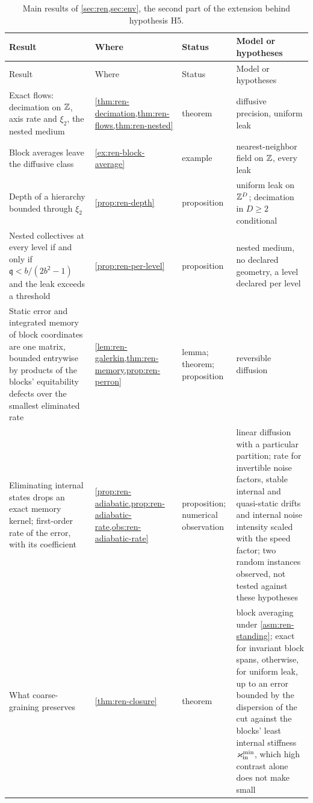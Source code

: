 \begingroup
\small
\setlength{\tabcolsep}{3pt}
\begin{longtable}{@{}>{\raggedright\arraybackslash}p{}>{\raggedright\arraybackslash}p{}>{\raggedright\arraybackslash}p{}>{\raggedright\arraybackslash}p{}@{}}
\caption{Main results of \cref{sec:ren,sec:env}, the second part of the extension behind hypothesis H5.}\label{tab:int-results-d}\\
\toprule
Result & Where & Status & Model or hypotheses\\
\midrule
\endfirsthead
\toprule
Result & Where & Status & Model or hypotheses\\
\midrule
\endhead
\bottomrule
\endfoot
Exact flows: decimation on $\mathbb{Z}$, axis rate and $\xi_2$, the nested medium & \cref{thm:ren-decimation,thm:ren-flows,thm:ren-nested} & theorem & diffusive precision, uniform leak\\
Block averages leave the diffusive class & \cref{ex:ren-block-average} & example & nearest-neighbor field on $\mathbb{Z}$, every leak\\
Depth of a hierarchy bounded through $\xi_2$ & \cref{prop:ren-depth} & proposition & uniform leak on $\mathbb{Z}^D$; decimation in $D\ge2$ conditional\\
Nested collectives at every level if and only if $\mathfrak q<b/(2b^2-1)$ and the leak exceeds a threshold & \cref{prop:ren-per-level} & proposition & nested medium, no declared geometry, a level declared per level\\
Static error and integrated memory of block coordinates are one matrix, bounded entrywise by products of the blocks' equitability defects over the smallest eliminated rate & \cref{lem:ren-galerkin,thm:ren-memory,prop:ren-perron} & lemma; theorem; proposition & reversible diffusion\\
Eliminating internal states drops an exact memory kernel; first-order rate of the error, with its coefficient & \cref{prop:ren-adiabatic,prop:ren-adiabatic-rate,obs:ren-adiabatic-rate} & proposition; numerical observation & linear diffusion with a particular partition; rate for invertible noise factors, stable internal and quasi-static drifts and internal noise intensity scaled with the speed factor; two random instances observed, not tested against these hypotheses\\
What coarse-graining preserves & \cref{thm:ren-closure} & theorem & block averaging under \cref{asm:ren-standing}; exact for invariant block spans, otherwise, for uniform leak, up to an error bounded by the dispersion of the cut against the blocks' least internal stiffness $\varkappa_{\mathrm{in}}^{\min}$, which high contrast alone does not make small\\

\end{longtable}
